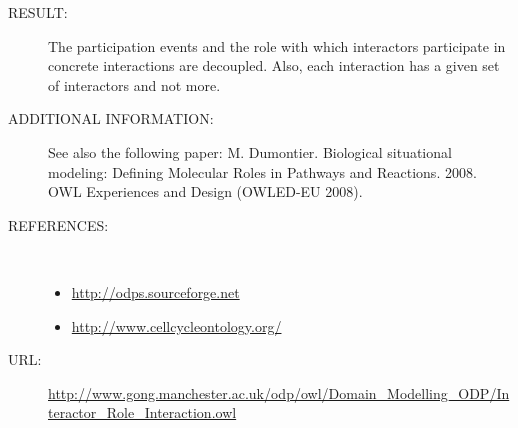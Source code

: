 \begin{description}
\item [RESULT:] The participation events and the role with which interactors participate in concrete interactions are decoupled. Also, each interaction has a given set of interactors and not more.

\item [ADDITIONAL INFORMATION:] See also the following paper: M. Dumontier. Biological situational modeling: Defining Molecular Roles in Pathways and Reactions. 2008. OWL Experiences and Design (OWLED-EU 2008).

\item [REFERENCES: ] ~\begin{itemize}
\item \url{http://odps.sourceforge.net}
\item \url{http://www.cellcycleontology.org/}\end{itemize}
\item [URL: ] \url{http://www.gong.manchester.ac.uk/odp/owl/Domain_Modelling_ODP/Interactor_Role_Interaction.owl} \end{description}